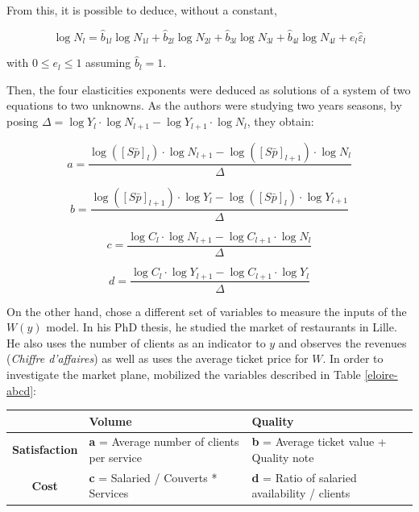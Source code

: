 \documentclass[a4paper, 12pt, openright, oneside, german, french, brazil, english]{abntex2}
\begin{document}
	From this, it is possible to deduce, without a constant,
	
	\begin{equation}
	\label{N-com-pesos}
		\log N_l = \hat{b}_{1l} \log N_{1l} + \hat{b}_{2l} \log N_{2l} + \hat{b}_{3l} \log N_{3l} + \hat{b}_{4l} \log N_{4l} + e_l \hat{\varepsilon}_l
	\end{equation}
	
	with $0 \le e_l \le 1$ assuming $\hat{b}_l = 1$.
	
	Then, the four elasticities exponents were deduced as solutions of a system of two equations to two unknowns. As the authors were studying two years seasons, by posing $\Delta = \log Y_l \cdot \log N_{l+1} - \log Y_{l+1} \cdot \log N_l$, they obtain:
	
	$$ a = \frac{ \log([S\bar{p}]_l) \cdot \log N_{l+1} - \log([S\bar{p}]_{l+1}) \cdot \log N_{l} }{\Delta} $$
	
	$$ b = \frac{ \log([S\bar{p}]_{l+1}) \cdot \log Y_{l} - \log([S\bar{p}]_{l}) \cdot \log Y_{l+1} }{\Delta} $$
	
	$$ c = \frac{ \log C_l \cdot \log N_{l+1} - \log C_{l+1} \cdot \log N_{l} }{\Delta} $$
	
	\begin{equation}
	\label{parameters}
		d = \frac{ \log C_l \cdot \log Y_{l+1} - \log C_{l+1} \cdot \log Y_{l} }{\Delta}
	\end{equation}
	




	On the other hand,  chose a different set of variables to measure the inputs of the $W(y)$ model. In his PhD thesis, he studied the market of restaurants in Lille. He also uses the number of clients as an indicator to $y$ and observes the revenues (\textit{Chiffre d'affaires}) as well as uses the average ticket price for $W$. In order to investigate the market plane,  mobilized the variables described in Table \ref{eloire-abcd}:

        \begin{table}[ht]
         {\begin{tabular}{c | p{5cm} p{5cm}}
         		\hline
            & \textbf{Volume}  & \textbf{Quality} \\
            \hline
            \textbf{Satisfaction}  & \textbf{a} = Average number of clients per service & \textbf{b} = Average ticket value + Quality note \\
            \textbf{Cost} & \textbf{c} = Salaried / Couverts * Services & \textbf{d} = Ratio of salaried availability / clients \\
            \hline
          \end{tabular}
      	}
  		{}
        \end{table}
\end{document}
